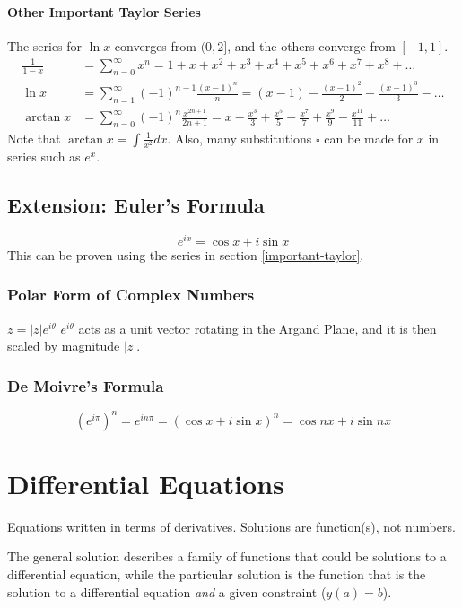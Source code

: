 \documentclass{article}
\begin{document}
\paragraph{Other Important Taylor Series}
The series for $\ln{x}$ converges from $(0,2]$, and the others converge from $[-1,1]$.
\begin{align*}
    \frac{1}{1-x}&=\sum_{n=0}^\infty x^n=1+x+x^2+x^3+x^4+x^5+x^6+x^7+x^8+\ldots\\
    \ln{x}&=\sum_{n=1}^\infty (-1)^{n-1}\frac{(x-1)^n}{n}=\left(x-1\right)-\frac{\left(x-1\right)^2}{2}+\frac{\left(x-1\right)^3}{3}-\ldots\\
    \arctan{x}&=\sum_{n=0}^\infty (-1)^{n}\frac{x^{2n+1}}{2n+1}=x-\frac{x^3}{3}+\frac{x^5}{5}-\frac{x^7}{7}+\frac{x^9}{9}-\frac{x^{11}}{11}+\ldots
\end{align*}
Note that $\arctan{x}=\int \frac{1}{x^2}dx$. Also, many substitutions $\square$ can be made for $x$ in series such as $e^x$.

\subsection{Extension: Euler's Formula}
$$e^{ix}=\cos{x}+i\sin{x}$$
This can be proven using the series in section \ref{important-taylor}.

\subsubsection{Polar Form of Complex Numbers}
$z=|z|e^{i\theta}$
$e^{i\theta}$ acts as a unit vector rotating in the Argand Plane, and it is then scaled by magnitude $|z|$.

\subsubsection{De Moivre's Formula}
$$\left(e^{i\pi}\right)^n = e^{in\pi} = \left(\cos{x}+i\sin{x}\right)^n = \cos{nx} + i\sin{nx}$$


\section{Differential Equations}
Equations written in terms of derivatives. Solutions are function(s), not numbers.

The general solution describes a family of functions that could be solutions to a differential equation, while the particular solution is the function that is the solution to a differential equation \emph{and} a given constraint ($y(a)=b$).
\end{document}
